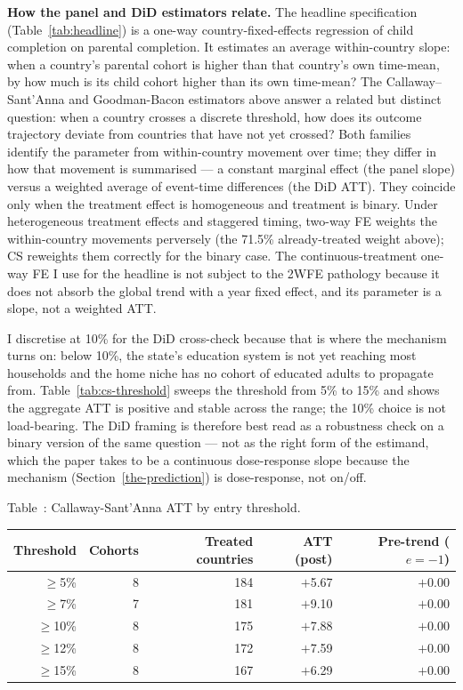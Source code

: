 \documentclass[12pt,letterpaper]{article}
\begin{document}
{\textbf{How the panel and DiD estimators relate.} The headline
specification (Table~\ref{tab:headline}) is a one-way country-fixed-effects
regression of child completion on parental completion. It estimates an
average within-country slope: when a country's parental cohort is
higher than that country's own time-mean, by how much is its child
cohort higher than its own time-mean? The Callaway--Sant'Anna and
Goodman-Bacon estimators above answer a related but distinct question:
when a country crosses a discrete threshold, how does its outcome
trajectory deviate from countries that have not yet crossed? Both
families identify the parameter from within-country movement over
time; they differ in how that movement is summarised --- a constant
marginal effect (the panel slope) versus a weighted average of
event-time differences (the DiD ATT). They coincide only when the
treatment effect is homogeneous and treatment is binary. Under
heterogeneous treatment effects and staggered timing, two-way FE
weights the within-country movements perversely (the
71.5\% already-treated weight above); CS reweights them correctly for
the binary case. The continuous-treatment one-way FE I use for the
headline is not subject to the 2WFE pathology because it does not
absorb the global trend with a year fixed effect, and its parameter is
a slope, not a weighted ATT.

I discretise at 10\% for the DiD cross-check because that is where the
mechanism turns on: below 10\%, the state's education system is not
yet reaching most households and the home niche has no cohort of
educated adults to propagate from. Table~\ref{tab:cs-threshold} sweeps
the threshold from 5\% to 15\% and shows the aggregate ATT is positive
and stable across the range; the 10\% choice is not load-bearing. The
DiD framing is therefore best read as a robustness check on a binary
version of the same question --- not as the right form of the
estimand, which the paper takes to be a continuous dose-response slope
because the mechanism (Section~\ref{the-prediction}) is dose-response,
not on/off.

\label{tab:cs-threshold}Table~\thetable: Callaway-Sant'Anna ATT by entry threshold.

\begin{center}
\begin{tabular}{@{}rrrrr@{}}
\toprule
Threshold & Cohorts & Treated countries & ATT (post) & Pre-trend ($e{=}{-}1$) \\
\midrule
$\geq$5\%  & 8 & 184 & $+$5.67 & $+$0.00 \\
$\geq$7\%  & 7 & 181 & $+$9.10 & $+$0.00 \\
$\geq$10\% & 8 & 175 & $+$7.88 & $+$0.00 \\
$\geq$12\% & 8 & 172 & $+$7.59 & $+$0.00 \\
$\geq$15\% & 8 & 167 & $+$6.29 & $+$0.00 \\
\bottomrule
\end{tabular}
\end{center}

}
\end{document}
